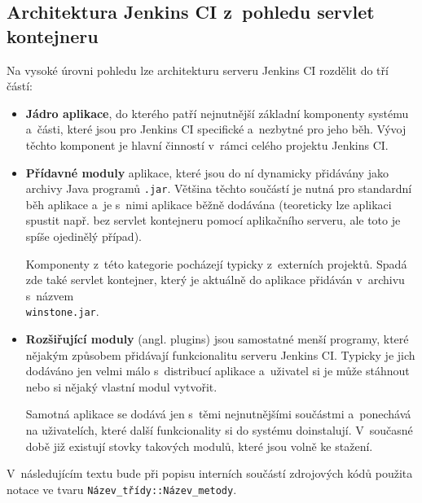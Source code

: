         \subsection{Architektura Jenkins CI z~pohledu servlet kontejneru} 
            Na vysoké úrovni pohledu lze architekturu serveru Jenkins CI rozdělit do tří částí:
            
            \begin{itemize}
                \item{\textbf{Jádro aplikace}, do kterého patří nejnutnější základní komponenty systému
                    a~části, které jsou pro Jenkins CI specifické a~nezbytné pro jeho běh. 
                    Vývoj těchto komponent je hlavní činností v~rámci celého projektu Jenkins CI.}

                \item{\textbf{Přídavné moduly} aplikace, které jsou do ní dynamicky přidávány jako archivy Java programů
                    \texttt{.jar}. Většina těchto součástí je nutná pro standardní běh aplikace a~je s~nimi aplikace
                    běžně dodávána (teoreticky lze
                    aplikaci spustit např. bez servlet kontejneru pomocí aplikačního serveru, ale toto je spíše ojedinělý případ). 
                    
                    Komponenty z~této kategorie pocházejí typicky z~externích projektů.
                    Spadá zde také servlet kontejner, který je aktuálně do aplikace
                    přidáván v~archivu s~názvem \\\texttt{winstone.jar}.}

                \item{\textbf{Rozšiřující moduly} (angl. plugins) jsou samostatné menší programy, které nějakým
                    způsobem přidávají funkcionalitu serveru Jenkins CI. Typicky je jich dodáváno jen velmi málo
s~distribucí aplikace 
                    a~uživatel si je může stáhnout nebo si nějaký vlastní modul vytvořit.
                    
                    Samotná aplikace se dodává jen s~těmi nejnutnějšími součástmi a~ponechává na uživatelích, které
                    další funkcionality si do systému doinstalují. V~současné době již existují stovky takových
                    modulů, které jsou volně ke stažení. }
            \end{itemize}
            

            V~následujícím textu bude při popisu interních součástí zdrojových kódů použita notace
            ve tvaru \texttt{Název\_třídy::Název\_metody}.

